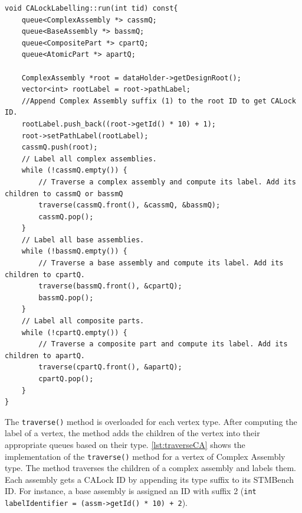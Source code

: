 \begin{lstlisting}[caption={BFS traversal for CALock labelling.}, label={lst:labelling-algo}]
void CALockLabelling::run(int tid) const{
    queue<ComplexAssembly *> cassmQ;
    queue<BaseAssembly *> bassmQ;
    queue<CompositePart *> cpartQ;
    queue<AtomicPart *> apartQ;

    ComplexAssembly *root = dataHolder->getDesignRoot();
    vector<int> rootLabel = root->pathLabel;
    //Append Complex Assembly suffix (1) to the root ID to get CALock ID.
    rootLabel.push_back((root->getId() * 10) + 1);
    root->setPathLabel(rootLabel);
    cassmQ.push(root);
    // Label all complex assemblies.
    while (!cassmQ.empty()) {
        // Traverse a complex assembly and compute its label. Add its children to cassmQ or bassmQ
        traverse(cassmQ.front(), &cassmQ, &bassmQ);
        cassmQ.pop();
    }
    // Label all base assemblies.
    while (!bassmQ.empty()) {
        // Traverse a base assembly and compute its label. Add its children to cpartQ.
        traverse(bassmQ.front(), &cpartQ);
        bassmQ.pop();
    }
    // Label all composite parts.
    while (!cpartQ.empty()) {
        // Traverse a composite part and compute its label. Add its children to apartQ.
        traverse(cpartQ.front(), &apartQ);
        cpartQ.pop();
    }
}
\end{lstlisting}

The \texttt{traverse()} method is overloaded for each vertex type. After computing the label of a vertex, the method adds the children of the vertex into their appropriate queues based on their type. \cref{lst:traverseCA} shows the implementation of the \texttt{traverse()} method for a vertex of Complex Assembly type. The method traverses the children of a complex assembly and labels them. Each assembly gets a CALock ID by appending its type suffix to its STMBench ID. For instance, a base assembly is assigned an ID with suffix 2 (\texttt{int labelIdentifier = (assm->getId() * 10) + 2}).

